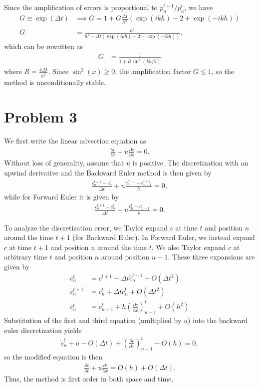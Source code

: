 \documentclass{article}
\begin{document}
Since the amplification of errors is proportional to $p^{t+1}_{n} / p^{t}_{n}$, we have
\begin{align}
    G \equiv \exp(\Delta t) &\implies G = 1 + G \frac{\Delta t}{h^2} \left( \exp(ikh) - 2 + \exp(-ikh) \right) \\
    G &= \frac{h^2} {h^2 - \Delta t \left( \exp(ikh) - 2 + \exp(-ikh) \right)},
\end{align}
which can be rewritten as
\begin{align}
    G &= \frac{1} {1 + R \sin^2 (kh/2)}
\end{align}
where $R = \frac{4 \Delta t}{h^2}$. Since $\sin^2(x) \ge 0$, the amplification factor $G \le 1$, so the method is unconditionally stable.

\section{Problem 3}
We first write the linear advection equation as
\begin{align}
    \frac{\partial c}{\partial t} + u \frac{\partial c}{\partial x} = 0.
\end{align}
Without loss of generality, assume that $u$ is positive. The discretization with an upwind derivative and the Backward Euler method is then given by
\begin{align}
    \frac{c^{t+1}_n - c^t_n}{\Delta t} + u \frac{c^{t+1}_n - c^{t+1}_{n-1}}{h} = 0,
\end{align}
while for Forward Euler it is given by
\begin{align}
    \frac{c^{t+1}_n - c^t_n}{\Delta t} + u \frac{c^{t}_n - c^{t}_{n-1}}{h} = 0.
\end{align}

To analyze the discretization error, we Taylor expand $c$ at time $t$ and position $n$ around the time $t+1$ (for Backward Euler).
In Forward Euler, we instead expand $c$ at time $t+1$ and position $n$ around the time $t$.
We also Taylor expand $c$ at arbitrary time $t$ and position $n$ around position $n-1$. These three expansions are given by
\begin{align}
    c^{t}_{n} &= c^{t+1} - \Delta t \dot{c}^{t+1}_n + O(\Delta t^2) \\
    c^{t+1}_{n} &= c^{t}_n + \Delta t \dot{c}^{t}_n + O(\Delta t^2) \\
    c^{t}_{n} &= c^{t}_{n-1} + h \left( \frac{\partial c}{\partial x} \right)^{t}_{n-1} + O(h^2)
\end{align}
Substitution of the first and third equation (multiplied by $u$) into the backward euler discretization yields
\begin{align}
    \dot{c}^{t}_n + u - O(\Delta t) + \left( \frac{\partial c}{\partial x} \right)^{t}_{n-1} - O(h) = 0,
\end{align}
so the modified equation is then
\begin{align}
    \frac{\partial c}{\partial t} + u \frac{\partial c}{\partial x} = O(h) + O(\Delta t).
\end{align}
Thus, the method is first order in both space and time.
\end{document}
